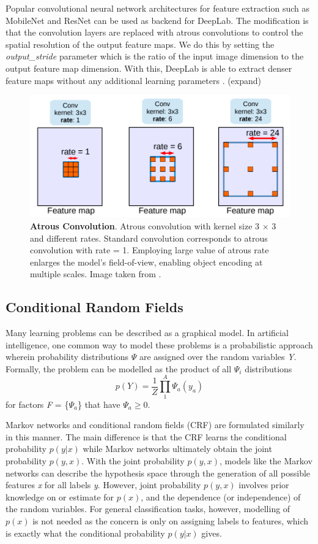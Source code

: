 \documentclass[journal]{IEEEtran}
\begin{document}
Popular convolutional neural network architectures for feature extraction such as MobileNet and ResNet can be used as backend for DeepLab. The modification is that the convolution layers are replaced with atrous convolutions to control the spatial resolution of the output feature maps. We do this by setting the \textit{output\_stride} parameter which is the ratio of the input image dimension to the output feature map dimension. With this, DeepLab is able to extract denser feature maps without any additional learning parameters \cite{DBLP:journals/corr/ChenPSA17}.
(expand)
\begin{figure}
\includegraphics[width=\linewidth]{atrous_conv.png}
\caption{\textbf{Atrous Convolution}. Atrous convolution with kernel size 3 × 3 and different rates. Standard convolution corresponds to atrous convolution
with rate = 1. Employing large value of atrous rate enlarges the
model’s field-of-view, enabling object encoding at multiple scales. Image taken from \cite{DBLP:journals/corr/ChenPSA17}.}
\label{fig:deeplab_atrous_conv}
\end{figure}
\subsection{Conditional Random Fields}
Many learning problems can be described as a graphical model. In artificial intelligence, one common way to model these problems is a probabilistic approach wherein probability distributions \textit{$\Psi$} are assigned over the random variables \textit{Y}. Formally, the problem can be modelled as the product of all \textit{$\Psi_i$} distributions
\begin{equation}
p(Y) = \frac{1}{Z}\prod_1^A \Psi_a(y_a)
\end{equation}
for factors \textit{F} = \{$\Psi_a$\} that have $\Psi_a \geq 0$. 
 
Markov networks and conditional random fields (CRF) are formulated similarly in this manner. The main difference is that the CRF learns the conditional probability $p(y|x)$ while Markov networks ultimately obtain the joint probability $p(y,x)$. With the joint probability $p(y,x)$, models like the Markov networks can describe the hypothesis space through the generation of all possible features \textit{x} for all labels \textit{y}. However, joint probability $p(y,x)$ involves prior knowledge on or estimate for $p(x)$, and the dependence (or independence) of the random variables. For general classification tasks, however, modelling of $p(x)$ is not needed as the concern is only on assigning labels to features, which is exactly what the conditional probability $p(y|x)$ gives.
\end{document}
